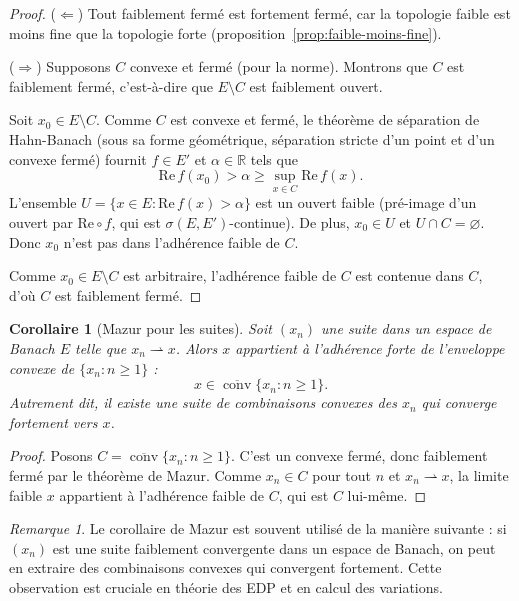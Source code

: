 \documentclass[a4paper,12pt]{book}
\DeclareMathOperator{\conv}{conv}
\newcommand{\R}{\mathbb{R}}
\newcommand{\weakto}{\rightharpoonup}
\theoremstyle{definition}
\theoremstyle{plain}
\newtheorem{corollaire}[definition]{Corollaire}
\theoremstyle{remark}
\newtheorem{remarque}[definition]{Remarque}
\begin{document}
\begin{proof}
\noindent($\Leftarrow$) Tout faiblement fermé est fortement fermé, car la topologie
faible est moins fine que la topologie forte (proposition~\ref{prop:faible-moins-fine}).

\medskip
\noindent($\Rightarrow$) Supposons $C$ convexe et fermé (pour la norme). Montrons
que $C$ est faiblement fermé, c'est-à-dire que $E \setminus C$ est faiblement ouvert.

Soit $x_0 \in E \setminus C$. Comme $C$ est convexe et fermé, le théorème de séparation
de Hahn-Banach
(sous sa forme géométrique, séparation stricte d'un point et d'un convexe fermé)
fournit $f \in E'$ et $\alpha \in \R$ tels que
\[
  \mathrm{Re}\, f(x_0) > \alpha \ge \sup_{x \in C} \mathrm{Re}\, f(x).
\]
L'ensemble $U = \{ x \in E : \mathrm{Re}\, f(x) > \alpha \}$ est un ouvert faible
(pré-image d'un ouvert par $\mathrm{Re} \circ f$, qui est $\sigma(E,E')$-continue).
De plus, $x_0 \in U$ et $U \cap C = \varnothing$. Donc $x_0$ n'est pas dans
l'adhérence faible de $C$.

Comme $x_0 \in E \setminus C$ est arbitraire, l'adhérence faible de $C$ est contenue
dans $C$, d'où $C$ est faiblement fermé.
\end{proof}

\begin{corollaire}[Mazur pour les suites]
\label{cor:mazur-suites}
Soit $(x_n)$ une suite dans un espace de Banach $E$ telle que $x_n \weakto x$.
Alors $x$ appartient à l'adhérence forte de l'enveloppe convexe
de $\{x_n : n \ge 1\}$ :
\[
  x \in \overline{\conv}\{x_n : n \ge 1\}.
\]
Autrement dit, il existe une suite de combinaisons convexes des $x_n$ qui converge
fortement vers $x$.
\end{corollaire}

\begin{proof}
Posons $C = \overline{\conv}\{x_n : n \ge 1\}$. C'est un convexe fermé, donc faiblement
fermé par le théorème de Mazur. Comme $x_n \in C$ pour tout $n$ et $x_n \weakto x$,
la limite faible $x$ appartient à l'adhérence faible de $C$, qui est $C$ lui-même.
\end{proof}

\begin{remarque}
\label{rem:mazur-constructif}
Le corollaire de Mazur est souvent utilisé de la manière suivante : si $(x_n)$ est une
suite faiblement convergente dans un espace de Banach, on peut en extraire des
combinaisons convexes qui convergent fortement. Cette observation est cruciale en
théorie des EDP et en calcul des variations.
\end{remarque}
\end{document}
